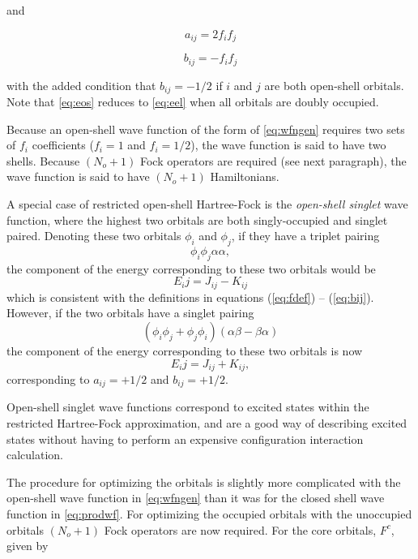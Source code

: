 \noindent and

\begin{equation}
	a_{ij} = 2f_if_j
\label{eq:aij}
\end{equation}

\begin{equation}
	b_{ij} = -f_if_j 
\label{eq:bij}
\end{equation}

\noindent with the added condition that $b_{ij} = -1/2$ if $i$ and $j$
are both open-shell orbitals. Note that \ref{eq:eos} reduces to
\ref{eq:eel} when all orbitals are doubly occupied.

Because an open-shell wave function of the form of \ref{eq:wfngen}
requires two sets of $f_i$ coefficients ($f_i = 1$ and $f_i = 1/2$),
the wave function is said to have two shells. Because $(N_o+1)$ Fock 
operators are required (see next paragraph), the wave function is said
to have $(N_o+1)$ Hamiltonians. 

A special case of restricted open-shell Hartree-Fock is the
\emph{open-shell singlet} wave function, where the highest two
orbitals are both singly-occupied and singlet paired. Denoting these
two orbitals $\phi_i$ and $\phi_j$, if they have a triplet pairing
\begin{equation}
\phi_i\phi_j\alpha\alpha, 
\end{equation}
the component of the energy corresponding to these two orbitals would
be 
\begin{equation}
 E_ij = J_{ij} - K_{ij}
\end{equation}
which is consistent with the definitions in equations (\ref{eq:fdef})
-- (\ref{eq:bij}). However, if the two orbitals have a singlet pairing
\begin{equation}
(\phi_i\phi_j+\phi_j\phi_i)(\alpha\beta-\beta\alpha)
\end{equation}
the component of the energy corresponding to these two orbitals is now
\begin{equation}
 E_ij = J_{ij} + K_{ij},
\end{equation}
corresponding to $a_{ij}=+1/2$ and $b_{ij}=+1/2$.

Open-shell singlet wave functions correspond to excited states within
the restricted Hartree-Fock approximation, and are a good way of
describing excited states without having to perform an expensive
configuration interaction calculation.

The procedure for optimizing the orbitals is
slightly more complicated with the open-shell wave
function in \ref{eq:wfngen} than it was for the closed shell
wave function in \ref{eq:prodwf}. For optimizing the occupied
orbitals with the unoccupied orbitals $(N_o+1)$ Fock
operators are now required. For the core orbitals, $F^c$,
given by 

